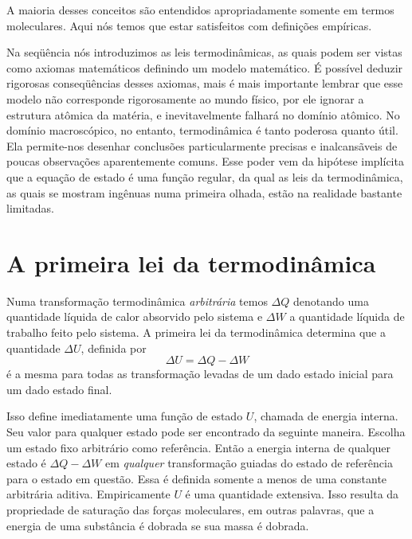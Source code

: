 A maioria desses conceitos s\~ao entendidos apropriadamente somente em termos moleculares. Aqui n\'os temos que estar satisfeitos com defini\c{c}\~oes emp\'iricas.

Na seq\"u\^encia n\'os introduzimos as leis termodin\^amicas, as quais podem ser vistas como axiomas matem\'aticos definindo um modelo matem\'atico. \'E poss\'ivel deduzir rigorosas conseq\"u\^encias desses axiomas, mais \'e mais importante lembrar que esse modelo n\~ao corresponde rigorosamente ao mundo f\'isico, por ele ignorar a estrutura at\^omica da mat\'eria, e inevitavelmente falhar\'a no dom\'inio at\^omico. No dom\'inio macrosc\'opico, no entanto, termodin\^amica \'e tanto poderosa quanto \'util. Ela permite-nos desenhar conclus\~oes particularmente precisas e inalcans\~aveis de poucas observa\c{c}\~oes aparentemente comuns. Esse poder vem da hip\'otese impl\'icita que a equa\c{c}\~ao de estado \'e uma fun\c{c}\~ao regular, da qual as leis da termodin\^amica, as quais se mostram ing\^enuas numa primeira olhada, est\~ao na realidade bastante limitadas.

\section{A primeira lei da termodin\^amica}
\noindent

Numa transforma\c{c}\~ao termodin\^amica {\it arbitr\'aria} temos $\Delta Q$ denotando uma quantidade l\'iquida de calor absorvido pelo sistema e $\Delta W$ a quantidade l\'iquida de trabalho feito pelo sistema. A primeira lei da termodin\^amica determina que a quantidade $\Delta U$, definida por
\begin{equation}
\Delta U=\Delta Q-\Delta W
\end{equation}
\'e a mesma para todas as transforma\c{c}\~ao levadas de um dado estado inicial para um dado estado final.

Isso define imediatamente uma fun\c{c}\~ao de estado $U$, chamada de energia interna. Seu valor para qualquer estado pode ser encontrado da seguinte maneira. Escolha um estado fixo arbitr\'ario como refer\^encia. Ent\~ao a energia interna de qualquer estado \'e $\Delta Q - \Delta W$ em {\it qualquer} transforma\c{c}\~ao guiadas do estado de refer\^encia para o estado em quest\~ao. Essa \'e definida somente a menos de uma constante arbitr\'aria aditiva. Empiricamente $U$ \'e uma quantidade extensiva. Isso resulta da propriedade de satura\c{c}\~ao das for\c{c}as moleculares, em outras palavras, que a energia de uma subst\^ancia \'e dobrada se sua massa \'e dobrada.

